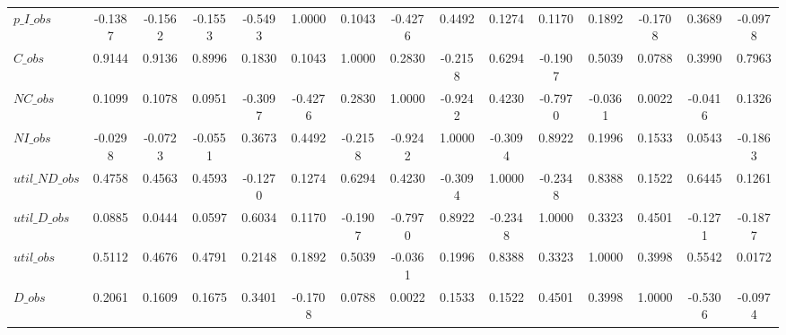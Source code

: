 \begin{center}
\begin{longtable}{lcccccccccccccc}
$p\_I\_obs      $	 & 	          -0.1387	 & 	          -0.1562	 & 	          -0.1553	 & 	          -0.5493	 & 	           1.0000	 & 	           0.1043	 & 	          -0.4276	 & 	           0.4492	 & 	           0.1274	 & 	           0.1170	 & 	           0.1892	 & 	          -0.1708	 & 	           0.3689	 & 	          -0.0978 \\ 
$C\_obs         $	 & 	           0.9144	 & 	           0.9136	 & 	           0.8996	 & 	           0.1830	 & 	           0.1043	 & 	           1.0000	 & 	           0.2830	 & 	          -0.2158	 & 	           0.6294	 & 	          -0.1907	 & 	           0.5039	 & 	           0.0788	 & 	           0.3990	 & 	           0.7963 \\ 
$NC\_obs        $	 & 	           0.1099	 & 	           0.1078	 & 	           0.0951	 & 	          -0.3097	 & 	          -0.4276	 & 	           0.2830	 & 	           1.0000	 & 	          -0.9242	 & 	           0.4230	 & 	          -0.7970	 & 	          -0.0361	 & 	           0.0022	 & 	          -0.0416	 & 	           0.1326 \\ 
$NI\_obs        $	 & 	          -0.0298	 & 	          -0.0723	 & 	          -0.0551	 & 	           0.3673	 & 	           0.4492	 & 	          -0.2158	 & 	          -0.9242	 & 	           1.0000	 & 	          -0.3094	 & 	           0.8922	 & 	           0.1996	 & 	           0.1533	 & 	           0.0543	 & 	          -0.1863 \\ 
$util\_ND\_obs  $	 & 	           0.4758	 & 	           0.4563	 & 	           0.4593	 & 	          -0.1270	 & 	           0.1274	 & 	           0.6294	 & 	           0.4230	 & 	          -0.3094	 & 	           1.0000	 & 	          -0.2348	 & 	           0.8388	 & 	           0.1522	 & 	           0.6445	 & 	           0.1261 \\ 
$util\_D\_obs   $	 & 	           0.0885	 & 	           0.0444	 & 	           0.0597	 & 	           0.6034	 & 	           0.1170	 & 	          -0.1907	 & 	          -0.7970	 & 	           0.8922	 & 	          -0.2348	 & 	           1.0000	 & 	           0.3323	 & 	           0.4501	 & 	          -0.1271	 & 	          -0.1877 \\ 
$util\_obs      $	 & 	           0.5112	 & 	           0.4676	 & 	           0.4791	 & 	           0.2148	 & 	           0.1892	 & 	           0.5039	 & 	          -0.0361	 & 	           0.1996	 & 	           0.8388	 & 	           0.3323	 & 	           1.0000	 & 	           0.3998	 & 	           0.5542	 & 	           0.0172 \\ 
$D\_obs         $	 & 	           0.2061	 & 	           0.1609	 & 	           0.1675	 & 	           0.3401	 & 	          -0.1708	 & 	           0.0788	 & 	           0.0022	 & 	           0.1533	 & 	           0.1522	 & 	           0.4501	 & 	           0.3998	 & 	           1.0000	 & 	          -0.5306	 & 	          -0.0974 \\ 

\end{longtable}
\end{center}
